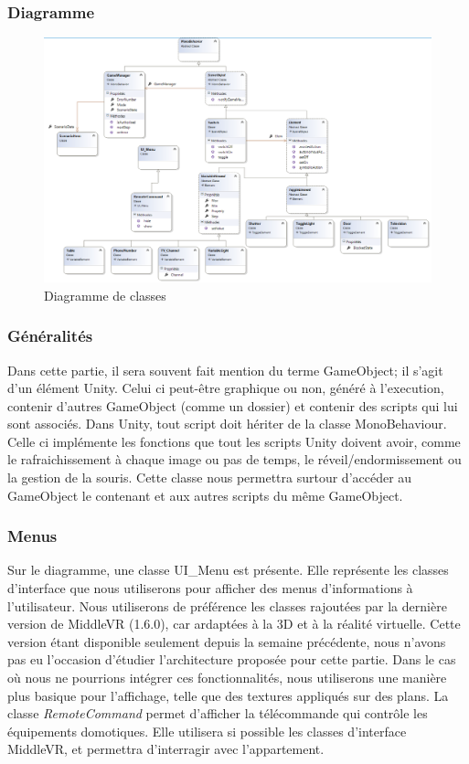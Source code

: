 \subsubsection{Diagramme}
\begin{figure}[h]
    \centering
    \includegraphics[width=\textwidth]{4-Conception/img/diagClasses.png}
    \caption{Diagramme de classes}
    \label{fig:class_diagram}
\end{figure}

\subsubsection{Généralités}
Dans cette partie, il sera souvent fait mention du terme GameObject; il s'agit d'un élément Unity. 
Celui ci peut-être graphique ou non, généré à l'execution, contenir d'autres GameObject (comme un dossier) et contenir des scripts qui lui sont associés.
\newline
Dans Unity, tout script doit hériter de la classe MonoBehaviour.
Celle ci implémente les fonctions que tout les scripts Unity doivent avoir, comme le rafraichissement à chaque image ou pas de temps, le réveil/endormissement ou la gestion de la souris.
Cette classe nous permettra surtour d'accéder au GameObject le contenant et aux autres scripts du même GameObject.

\subsubsection{Menus}
Sur le diagramme, une classe UI\_Menu est présente. Elle représente les classes d'interface que nous utiliserons pour afficher des menus d'informations à l'utilisateur.
Nous utiliserons de préférence les classes rajoutées par la dernière version de MiddleVR (1.6.0), car ardaptées à la 3D et à la réalité virtuelle.
Cette version étant disponible seulement depuis la semaine précédente, nous n'avons pas eu l'occasion d'étudier l'architecture proposée pour cette partie.
Dans le cas où nous ne pourrions intégrer ces fonctionnalités, nous utiliserons une manière plus basique pour l'affichage, telle que des textures appliqués sur des plans.
\newline
La classe \textit{RemoteCommand} permet d'afficher la télécommande qui contrôle les équipements domotiques. 
Elle utilisera si possible les classes d'interface MiddleVR, et permettra d'interragir avec l'appartement.


